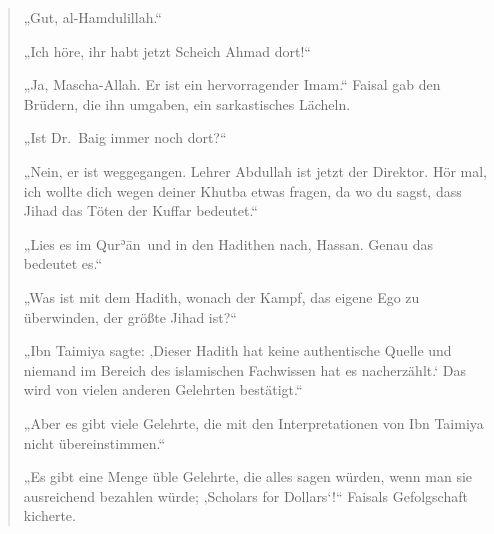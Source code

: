\documentclass[12pt]{memoir}
\def\´{ʾ} %
\def \Quran{Qur\-\´ān} %
\begin{document}
\begin{quote}
„Gut, al-Hamdulillah.“

„Ich höre, ihr habt jetzt Scheich Ahmad dort!“

„Ja, Mascha-Allah.
Er ist ein hervorragender Imam.“
Faisal gab den Brüdern, die ihn umgaben, ein sarkastisches Lächeln.

„Ist Dr.\ Baig immer noch dort?“

„Nein, er ist weggegangen.
Lehrer Abdullah ist jetzt der Direktor.
Hör mal, ich wollte dich wegen deiner Khutba etwas fragen,
da wo du sagst, dass Jihad das Töten der Kuffar bedeutet.“

„Lies es im \Quran\ und in den Hadithen nach, Hassan.
Genau das bedeutet es.“

„Was ist mit dem Hadith, wonach der Kampf, das eigene Ego zu überwinden,
der größte Jihad ist?“

„Ibn Taimiya sagte:
‚Dieser Hadith hat keine authentische Quelle und niemand
im Bereich des islamischen Fachwissen hat es nacherzählt.‘
Das wird von vielen anderen Gelehrten bestätigt.“

„Aber es gibt viele Gelehrte,
die mit den Interpretationen von Ibn Taimiya nicht übereinstimmen.“

„Es gibt eine Menge üble Gelehrte,
die alles sagen würden, wenn man sie ausreichend bezahlen würde;
‚Scholars for Dollars‘!“
Faisals Gefolgschaft kicherte.
\end{quote}
\end{document}
